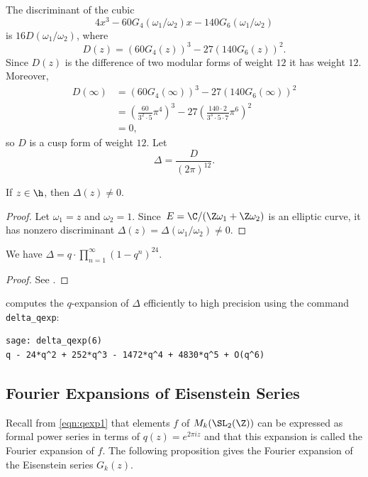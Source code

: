 The discriminant of the cubic $$4x^3 - 60G_4(\omega_1/\omega_2) x - 
140 G_6(\omega_1/\omega_2)$$ is $16D(\omega_1/\omega_2)$, where
$$
 D(z) = (60 G_4(z))^3 - 27(140 G_6(z))^2.
$$
Since $D(z)$ is the difference of two modular forms of
weight $12$ it has weight $12$. 
 Moreover, 
\begin{align*}
 D(\infty) &=
\left(60 G_4(\infty)\right)^3 - 
27\left(140 G_6(\infty)\right)^2\\
 &= \left(\frac{60}{3^2\cdot 5} \pi^4\right)^3 - 
27\left(\frac{140\cdot 2}{3^3\cdot 5\cdot 7} \pi^6\right)^2\\
&=
0,
\end{align*}
so $D$ is a cusp form of weight $12$.
Let\indexp{$\Delta$}
$$
  \Delta = \frac{D}{(2\pi)^{12}}.
$$
  
\begin{lemma}\label{lem:delnz}
If $z\in\h$, then $\Delta(z)\neq 0$.
\end{lemma}
\begin{proof}
Let $\omega_1=z$ and $\omega_2=1$.
Since~$E=\C/(\Z\omega_1 + \Z\omega_2)$ 
is an elliptic curve,
it has nonzero discriminant
$\Delta(z) = \Delta(\omega_1/\omega_2)\neq 0$.
\end{proof}

\begin{proposition}
We have $\Delta = q\cdot \prod_{n=1}^{\infty}(1-q^n)^{24}$.
\end{proposition}
\begin{proof}
See \cite[Thm.~6, pg.~95]{serre:arithmetic}.
\end{proof}

\begin{remark}
\sage{} computes the $q$-expansion of $\Delta$ efficiently
to high precision using the command {\tt delta\_qexp}:
\begin{verbatim}
sage: delta_qexp(6)
q - 24*q^2 + 252*q^3 - 1472*q^4 + 4830*q^5 + O(q^6)
\end{verbatim}
\end{remark}

\subsection{Fourier Expansions of Eisenstein Series}\label{sec:fourexpeis}%
Recall from \eqref{eqn:qexp1} that elements $f$ of $M_k(\SL_2(\Z))$ can be
expressed as formal power series in terms of $q(z)=e^{2\pi i z}$ and
that this expansion is called the Fourier expansion of $f$.
The following proposition gives the Fourier expansion of the
Eisenstein series $G_k(z)$.

